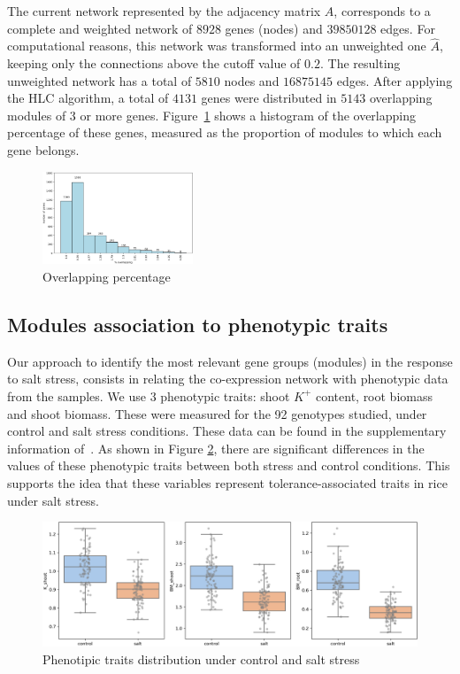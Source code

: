 \documentclass[journal, onecolumn]{IEEEtran}
\begin{document}
The current network represented by the adjacency matrix $A$, corresponds to a complete and weighted network of $8928$ genes (nodes) and $39850128$ edges. For computational reasons, this network was transformed into an unweighted one $\hat{A}$, keeping only the connections above the cutoff value of $0.2$. The resulting unweighted network has a total of $5810$ nodes and $16875145$ edges. After applying the HLC algorithm, a total of $4131$ genes were distributed in $5143$ overlapping modules of $3$ or more genes. Figure~\ref{fig:overlap} shows a histogram of the overlapping percentage of these genes, measured as the proportion of modules to which each gene belongs.\\

\begin{figure}[h]
  \centering
    \includegraphics[clip,width=0.4\textwidth]{Figures/artificial_modules.png}
  \caption{Overlapping percentage}
  \label{fig:overlap}
\end{figure}

\subsection{Modules association to phenotypic traits}
Our approach to identify the most relevant gene groups (modules) in the response to salt stress, consists in relating the co-expression network with phenotypic data from the samples. We use 3 phenotypic traits: shoot $K^+$ content, root biomass and shoot biomass. These were measured for the 92 genotypes studied, under  control and salt stress conditions. These data can be found in the supplementary information of~\cite{campbell2017allelic}. As shown in Figure \ref{fig:pdata}, there are significant differences in the values of these phenotypic traits between both stress and control conditions. This supports the idea that these variables represent tolerance-associated traits in rice under salt stress.\\

\begin{figure}[h]
  \centering
    \includegraphics[clip,width=1\textwidth]{Figures/phenotypic_traits.png}
  \caption{Phenotipic traits distribution under control and salt stress}
  \label{fig:pdata}
\end{figure}
\end{document}
